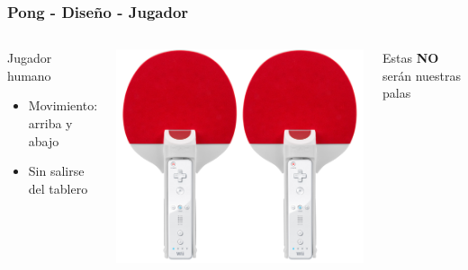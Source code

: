 \begin{frame}
	\frametitle{Pong - Diseño - Jugador}
	
	\begin{columns}[c]
	\column{175pt}	
	
	\begin{block}{Jugador humano}
		\begin{itemize}
			\item Movimiento: arriba y abajo
			\item Sin salirse del tablero
		\end{itemize}            
	\end{block}
	
	\column{125pt}
	
	\begin{center}
		\includegraphics[scale=0.6]{img/wiipong.png}
	\end{center}	
	
	\begin{center}
	Estas \textbf{NO} serán nuestras palas
	\end{center}
	
	\end{columns}
	
\end{frame}


